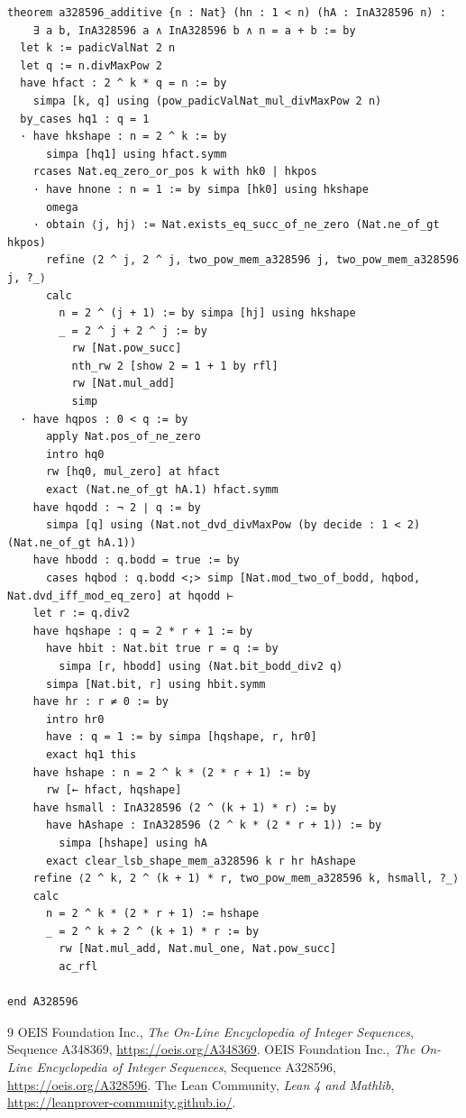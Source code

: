 \documentclass[11pt]{article}
\theoremstyle{definition}
\theoremstyle{remark}
\begin{document}
\begin{lstlisting}
theorem a328596_additive {n : Nat} (hn : 1 < n) (hA : InA328596 n) :
    ∃ a b, InA328596 a ∧ InA328596 b ∧ n = a + b := by
  let k := padicValNat 2 n
  let q := n.divMaxPow 2
  have hfact : 2 ^ k * q = n := by
    simpa [k, q] using (pow_padicValNat_mul_divMaxPow 2 n)
  by_cases hq1 : q = 1
  · have hkshape : n = 2 ^ k := by
      simpa [hq1] using hfact.symm
    rcases Nat.eq_zero_or_pos k with hk0 | hkpos
    · have hnone : n = 1 := by simpa [hk0] using hkshape
      omega
    · obtain ⟨j, hj⟩ := Nat.exists_eq_succ_of_ne_zero (Nat.ne_of_gt hkpos)
      refine ⟨2 ^ j, 2 ^ j, two_pow_mem_a328596 j, two_pow_mem_a328596 j, ?_⟩
      calc
        n = 2 ^ (j + 1) := by simpa [hj] using hkshape
        _ = 2 ^ j + 2 ^ j := by
          rw [Nat.pow_succ]
          nth_rw 2 [show 2 = 1 + 1 by rfl]
          rw [Nat.mul_add]
          simp
  · have hqpos : 0 < q := by
      apply Nat.pos_of_ne_zero
      intro hq0
      rw [hq0, mul_zero] at hfact
      exact (Nat.ne_of_gt hA.1) hfact.symm
    have hqodd : ¬ 2 ∣ q := by
      simpa [q] using (Nat.not_dvd_divMaxPow (by decide : 1 < 2) (Nat.ne_of_gt hA.1))
    have hbodd : q.bodd = true := by
      cases hqbod : q.bodd <;> simp [Nat.mod_two_of_bodd, hqbod, Nat.dvd_iff_mod_eq_zero] at hqodd ⊢
    let r := q.div2
    have hqshape : q = 2 * r + 1 := by
      have hbit : Nat.bit true r = q := by
        simpa [r, hbodd] using (Nat.bit_bodd_div2 q)
      simpa [Nat.bit, r] using hbit.symm
    have hr : r ≠ 0 := by
      intro hr0
      have : q = 1 := by simpa [hqshape, r, hr0]
      exact hq1 this
    have hshape : n = 2 ^ k * (2 * r + 1) := by
      rw [← hfact, hqshape]
    have hsmall : InA328596 (2 ^ (k + 1) * r) := by
      have hAshape : InA328596 (2 ^ k * (2 * r + 1)) := by
        simpa [hshape] using hA
      exact clear_lsb_shape_mem_a328596 k r hr hAshape
    refine ⟨2 ^ k, 2 ^ (k + 1) * r, two_pow_mem_a328596 k, hsmall, ?_⟩
    calc
      n = 2 ^ k * (2 * r + 1) := hshape
      _ = 2 ^ k + 2 ^ (k + 1) * r := by
        rw [Nat.mul_add, Nat.mul_one, Nat.pow_succ]
        ac_rfl

end A328596
\end{lstlisting}

\begin{thebibliography}{9}
OEIS Foundation Inc., \emph{The On-Line Encyclopedia of Integer Sequences},
Sequence A348369, \url{https://oeis.org/A348369}.
OEIS Foundation Inc., \emph{The On-Line Encyclopedia of Integer Sequences},
Sequence A328596, \url{https://oeis.org/A328596}.
The Lean Community, \emph{Lean 4 and Mathlib},
\url{https://leanprover-community.github.io/}.
\end{thebibliography}
\end{document}
